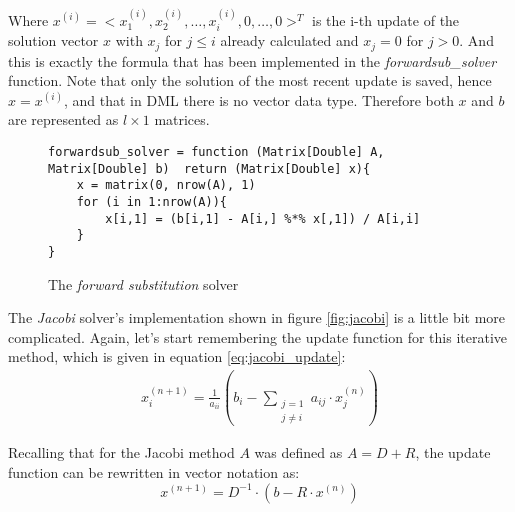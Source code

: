 Where $x^{(i)}=<x^{(i)}_1, x^{(i)}_2, \dots, x^{(i)}_i, 0, \dots, 0>^T$ is the i-th update of the solution vector $x$ with $x_j$ for $j \leq i$ already calculated and $x_j = 0$ for $j > 0$.
And this is exactly the formula that has been implemented in the \textit{forwardsub\_solver} function. Note that only the solution of the most recent update is saved, hence $x = x^{(i)}$, and that in \acs{DML} there is no vector data type. Therefore both $x$ and $b$ are represented as $l \times 1$ matrices.

\begin{figure}[!ht]
\centering
\begin{verbatim}
forwardsub_solver = function (Matrix[Double] A, Matrix[Double] b)  return (Matrix[Double] x){
    x = matrix(0, nrow(A), 1)
    for (i in 1:nrow(A)){
        x[i,1] = (b[i,1] - A[i,] %*% x[,1]) / A[i,i]
    }
}
\end{verbatim}
\vspace*{-0.3cm}
\caption{The \textit{forward substitution} solver}
\label{fig:forwardsub}
\end{figure}

The \textit{Jacobi} solver's implementation shown in figure \ref{fig:jacobi} is a little bit more complicated. Again, let's start remembering the update function for this iterative method, which is given in equation \ref{eq:jacobi_update}: 
\begin{equation*}
	\begin{array}{lrcl}
		x_i^{(n+1)}  = \frac{1}{a_{ii}} (b_i - \displaystyle\sum_{\substack{j=1 \\ j\neq i}} a_{ij} \cdot x_j^{(n)})
	\end{array}
\end{equation*}

Recalling that for the Jacobi method $A$ was defined as $A=D+R$, the update function can be rewritten in vector notation as:
\begin{equation*}
	x^{(n+1)} = D^{-1} \cdot (b - R \cdot x^{(n)})
\end{equation*}

